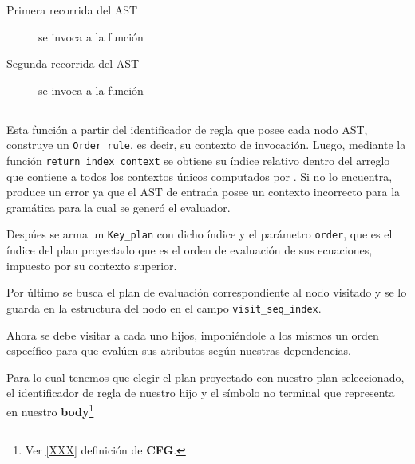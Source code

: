 \begin{description}
\item [Primera recorrida del AST] se invoca a la función

\item [Segunda recorrida del AST] se invoca a la función
\end{description}

\subsection*{}

Esta función a partir del identificador de regla que posee cada nodo AST, construye un \texttt{Order\_rule}, es decir, su contexto de invocación. Luego, mediante la función \texttt{return\_index\_context} se obtiene su índice relativo dentro del arreglo que contiene a todos los contextos únicos computados por \maggen. Si no lo encuentra, produce un error ya que el AST de entrada posee un contexto incorrecto para la gramática para la cual se generó el evaluador.

Despúes se arma un \texttt{Key\_plan} con dicho índice y el parámetro \texttt{order}, que es el índice del plan proyectado que es el orden de evaluación de sus ecuaciones, impuesto por su contexto superior.

Por último se busca el plan de evaluación correspondiente al nodo visitado y se lo guarda en la estructura del nodo en el campo \texttt{visit\_seq\_index}.

Ahora se debe visitar a cada uno hijos, imponiéndole a los mismos un orden específico para que evalúen sus atributos según nuestras dependencias.

Para lo cual tenemos que elegir el plan proyectado con nuestro plan seleccionado, el identificador de regla de nuestro hijo y el símbolo no terminal que representa en nuestro \textbf{body}\footnote{Ver \ref{XXX} definición de \textbf{CFG}.}

